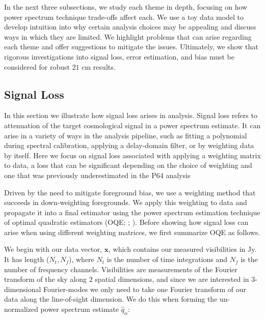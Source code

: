 \documentclass[preprint2,numberedappendix,tighten]{aastex6}  %
\begin{document}
In the next three subsections, we study each theme in depth, focusing on how power spectrum technique trade-offs affect each. We use a toy data model to develop intuition into why certain analysis choices may be appealing and discuss ways in which they are limited. We highlight problems that can arise regarding each theme and offer suggestions to mitigate the issues. Ultimately, we show that rigorous investigations into signal loss, error estimation, and bias must be considered for robust $21$ cm results.


\subsection{Signal Loss}
\label{sec:SiglossOverview}

In this section we illustrate how signal loss arises in analysis. Signal loss refers to attenuation of the target cosmological signal in a power spectrum estimate. It can arise in a variety of ways in the analysis pipeline, such as fitting a polynomial during spectral calibration, applying a delay-domain filter, or by weighting data by itself. Here we focus on signal loss associated with applying a weighting matrix to data, a loss that can be significant depending on the choice of weighting and one that was previously underestimated in the P64 analysis

Driven by the need to mitigate foreground bias, we use a weighting method that succeeds in down-weighting foregrounds. We apply this weighting to data and propagate it into a final estimator using the power spectrum estimation technique of optimal quadratic estimators (OQE; \citealt{liu_tegmark2011}; \citealt{liu_et_al2014b}). Before showing how signal loss can arise when using different weighting matrices, we first summarize OQE as follows.

We begin with our data vector, $\textbf{x}$, which contains our measured visibilities in Jy. It has length ($N_{t}, N_{f}$), where $N_{t}$ is the number of time integrations and $N_{f}$ is the number of frequency channels. Visibilities are measurements of the Fourier transform of the sky along $2$ spatial dimensions, and since we are interested in $3$-dimensional Fourier-modes we only need to take one Fourier transform of our data along the line-of-sight dimension. We do this when forming the un-normalized power spectrum estimate $\hat{q}_{\alpha}$:
\end{document}
